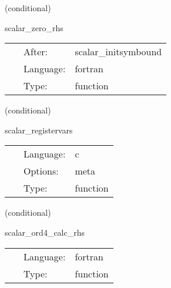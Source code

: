 \vspace{5mm}

   (conditional) 

\hspace{5mm} scalar\_zero\_rhs 

\hspace{5mm}{\it set all rhs functions to zero to prevent spurious nans } 


\hspace{5mm}

 \begin{tabular*}{160mm}{cll} 
~ & After:  & scalar\_initsymbound \\ 
~ & Language:  & fortran \\ 
~ & Type:  & function \\ 
\end{tabular*} 


\vspace{5mm}

   (conditional) 

\hspace{5mm} scalar\_registervars 

\hspace{5mm}{\it register variables for mol } 


\hspace{5mm}

 \begin{tabular*}{160mm}{cll} 
~ & Language:  & c \\ 
~ & Options:  & meta \\ 
~ & Type:  & function \\ 
\end{tabular*} 


\vspace{5mm}

   (conditional) 

\hspace{5mm} scalar\_ord4\_calc\_rhs 

\hspace{5mm}{\it mol rhs calculation for scalar variables } 


\hspace{5mm}

 \begin{tabular*}{160mm}{cll} 
~ & Language:  & fortran \\ 
~ & Type:  & function \\ 
\end{tabular*} 


